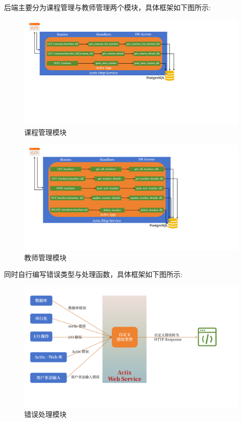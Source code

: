 \documentclass[12pt, oneside]{ctexart}
\numberwithin{figure}{section}
\numberwithin{table}{section}
\begin{document}
后端主要分为课程管理与教师管理两个模块，具体框架如下图所示:
\begin{figure}[!htbp]
    \centering
    \includegraphics[width=13cm]{images/sec5/Back_End_Course.pdf}
    \caption{课程管理模块}
\end{figure}
\newpage
\begin{figure}[!htbp]
    \centering
    \includegraphics[width=13cm]{images/sec5/Back_End_Teacher.pdf}
    \caption{教师管理模块}
\end{figure}

同时自行编写错误类型与处理函数，具体框架如下图所示:
\begin{figure}[!htbp]
    \centering
    \includegraphics[width=13cm]{images/sec5/My_Error.pdf}
    \caption{错误处理模块}
\end{figure}
\end{document}
